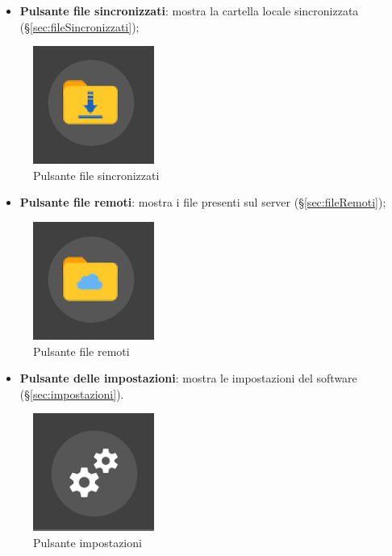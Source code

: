 \begin{itemize}
\item \textbf{Pulsante file sincronizzati}: mostra la cartella locale sincronizzata (\S{}\ref{sec:fileSincronizzati}); \
\end{itemize}
\begin{figure}[H]
    \centering
    \includegraphics[scale = 1]{components/img/pulsanteFileS.png}
    \caption{Pulsante file sincronizzati}
    \label{fig:PfileSync}
\end{figure}
\begin{itemize}
\item \textbf{Pulsante file remoti}: mostra i file presenti sul server (\S{}\ref{sec:fileRemoti}); \
\end{itemize}
\begin{figure}[H]
    \centering
    \includegraphics[scale = 1]{components/img/pulsanteFileR.png}
    \caption{Pulsante file remoti}
    \label{fig:PfileRem}
\end{figure}
\begin{itemize}
\item \textbf{Pulsante delle impostazioni}: mostra le impostazioni del software (\S{}\ref{sec:impostazioni}). \
\end{itemize}
\begin{figure}[H]
    \centering
    \includegraphics[scale = 1]{components/img/pulsanteImpostazioni.png}
    \caption{Pulsante impostazioni}
    \label{fig:PImp}
\end{figure}


